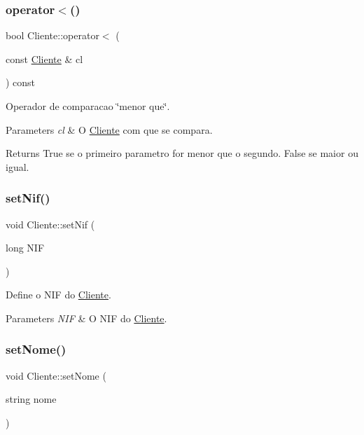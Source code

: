 \subsubsection{\texorpdfstring{operator$<$()}{operator<()}}
{\footnotesize\ttfamily bool Cliente\+::operator$<$ (\begin{DoxyParamCaption}\item[{const \hyperlink{class_cliente}{Cliente} \&}]{cl }\end{DoxyParamCaption}) const}



Operador de comparacao \char`\"{}menor que\char`\"{}. 


\begin{DoxyParams}{Parameters}
{\em cl} & O \hyperlink{class_cliente}{Cliente} com que se compara.\\
\hline
\end{DoxyParams}
\begin{DoxyReturn}{Returns}
True se o primeiro parametro for menor que o segundo. False se maior ou igual. 
\end{DoxyReturn}
\hypertarget{class_cliente_a8d729975d853d8f4a0123906655b5e73}{}\label{class_cliente_a8d729975d853d8f4a0123906655b5e73} 
\subsubsection{\texorpdfstring{set\+Nif()}{setNif()}}
{\footnotesize\ttfamily void Cliente\+::set\+Nif (\begin{DoxyParamCaption}\item[{long}]{N\+IF }\end{DoxyParamCaption})}



Define o N\+IF do \hyperlink{class_cliente}{Cliente}. 


\begin{DoxyParams}{Parameters}
{\em N\+IF} & O N\+IF do \hyperlink{class_cliente}{Cliente}. \\
\hline
\end{DoxyParams}
\hypertarget{class_cliente_a383af20fa7ace06d4f04fe26e82e0ca2}{}\label{class_cliente_a383af20fa7ace06d4f04fe26e82e0ca2} 
\subsubsection{\texorpdfstring{set\+Nome()}{setNome()}}
{\footnotesize\ttfamily void Cliente\+::set\+Nome (\begin{DoxyParamCaption}\item[{string}]{nome }\end{DoxyParamCaption})}



